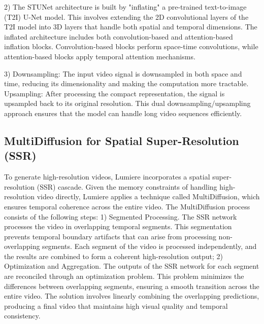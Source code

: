 \documentclass[conference]{IEEEtran}
\theoremstyle{definition}
\theoremstyle{plain}
\theoremstyle{remark}
\begin{document}
2)
The STUNet architecture is built by "inflating" a pre-trained text-to-image (T2I) U-Net model. This involves extending the 2D convolutional layers of the T2I model into 3D layers that handle both spatial and temporal dimensions.
The inflated architecture includes both convolution-based and attention-based inflation blocks. Convolution-based blocks perform space-time convolutions, while attention-based blocks apply temporal attention mechanisms.

3)
Downsampling: The input video signal is downsampled in both space and time, reducing its dimensionality and making the computation more tractable.
Upsampling: After processing the compact representation, the signal is upsampled back to its original resolution. This dual downsampling/upsampling approach ensures that the model can handle long video sequences efficiently.

\subsection{MultiDiffusion for Spatial Super-Resolution (SSR)}
To generate high-resolution videos, Lumiere incorporates a spatial super-resolution (SSR) cascade. 
Given the memory constraints of handling high-resolution video directly, Lumiere applies a technique called MultiDiffusion, which ensures temporal coherence across the entire video.
The MultiDiffusion process consists of the following steps: 
1) Segmented Processing. 
The SSR network processes the video in overlapping temporal segments. This segmentation prevents temporal boundary artifacts that can arise from processing non-overlapping segments.
Each segment of the video is processed independently, and the results are combined to form a coherent high-resolution output;
2) Optimization and Aggregation.
The outputs of the SSR network for each segment are reconciled through an optimization problem. This problem minimizes the differences between overlapping segments, ensuring a smooth transition across the entire video.
The solution involves linearly combining the overlapping predictions, producing a final video that maintains high visual quality and temporal consistency.
\end{document}
